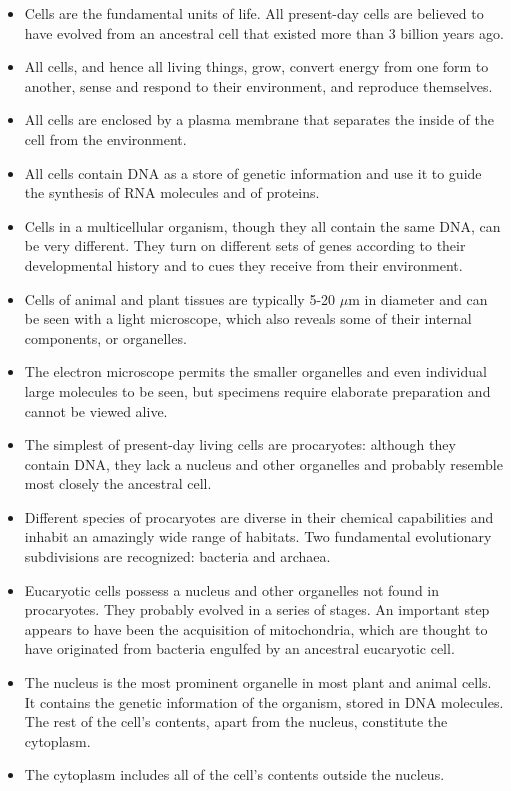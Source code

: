 \begin{itemize}
\item Cells are the fundamental units of life. All present-day cells are
believed to have evolved from an ancestral cell that existed more
than 3 billion years ago.
\item All cells, and hence all living things, grow, convert energy from one
form to another, sense and respond to their environment, and reproduce themselves.
\item All cells are enclosed by a plasma membrane that separates the inside
of the cell from the environment.
\item All cells contain DNA as a store of genetic information and use it to
guide the synthesis of RNA molecules and of proteins.
\item Cells in a multicellular organism, though they all contain the same
DNA, can be very different. They turn on different sets of genes
according to their developmental history and to cues they receive
from their environment.
\item Cells of animal and plant tissues are typically 5-20 $\mu$m in diameter
and can be seen with a light microscope, which also reveals some of
their internal components, or organelles.
\item The electron microscope permits the smaller organelles and even
individual large molecules to be seen, but specimens require elaborate preparation and cannot be viewed alive.
\item The simplest of present-day living cells are procaryotes: although
they contain DNA, they lack a nucleus and other organelles and probably resemble most closely the ancestral cell.
\item Different species of procaryotes are diverse in their chemical
capabilities and inhabit an amazingly wide range of habitats. Two
fundamental evolutionary subdivisions are recognized: bacteria and
archaea.
\item Eucaryotic cells possess a nucleus and other organelles not found in
procaryotes. They probably evolved in a series of stages. An important step appears to have been the acquisition of mitochondria, which
are thought to have originated from bacteria engulfed by an ancestral
eucaryotic cell.
\item The nucleus is the most prominent organelle in most plant and animal cells. It contains the genetic information of the organism, stored in DNA molecules. The rest of the cell’s contents, apart from the
nucleus, constitute the cytoplasm.
\item The cytoplasm includes all of the cell’s contents outside the nucleus.

\end{itemize}
